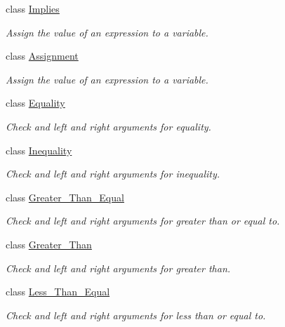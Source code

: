 \begin{DoxyCompactItemize}
class \hyperlink{classMadara_1_1Expression__Tree_1_1Implies}{Implies}
\begin{DoxyCompactList}\small\item\em Assign the value of an expression to a variable. \item\end{DoxyCompactList}\item 
class \hyperlink{classMadara_1_1Expression__Tree_1_1Assignment}{Assignment}
\begin{DoxyCompactList}\small\item\em Assign the value of an expression to a variable. \item\end{DoxyCompactList}\item 
class \hyperlink{classMadara_1_1Expression__Tree_1_1Equality}{Equality}
\begin{DoxyCompactList}\small\item\em Check and left and right arguments for equality. \item\end{DoxyCompactList}\item 
class \hyperlink{classMadara_1_1Expression__Tree_1_1Inequality}{Inequality}
\begin{DoxyCompactList}\small\item\em Check and left and right arguments for inequality. \item\end{DoxyCompactList}\item 
class \hyperlink{classMadara_1_1Expression__Tree_1_1Greater__Than__Equal}{Greater\_\-Than\_\-Equal}
\begin{DoxyCompactList}\small\item\em Check and left and right arguments for greater than or equal to. \item\end{DoxyCompactList}\item 
class \hyperlink{classMadara_1_1Expression__Tree_1_1Greater__Than}{Greater\_\-Than}
\begin{DoxyCompactList}\small\item\em Check and left and right arguments for greater than. \item\end{DoxyCompactList}\item 
class \hyperlink{classMadara_1_1Expression__Tree_1_1Less__Than__Equal}{Less\_\-Than\_\-Equal}
\begin{DoxyCompactList}\small\item\em Check and left and right arguments for less than or equal to. \item\end{DoxyCompactList}\item 

\end{DoxyCompactItemize}
